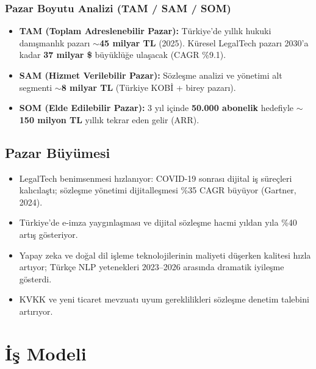 \documentclass[12pt,a4paper]{article}
\begin{document}
\subsubsection{Pazar Boyutu Analizi (TAM / SAM / SOM)}

\begin{itemize}[itemsep=5pt]
  \item \textbf{TAM (Toplam Adreslenebilir Pazar):} Türkiye'de yıllık hukuki danışmanlık pazarı
  $\sim$\textbf{45 milyar TL} (2025). Küresel LegalTech pazarı 2030'a kadar \textbf{37 milyar \$}
  büyüklüğe ulaşacak (CAGR \%9.1).

  \item \textbf{SAM (Hizmet Verilebilir Pazar):} Sözleşme analizi ve yönetimi alt segmenti
  $\sim$\textbf{8 milyar TL} (Türkiye KOBİ + birey pazarı).

  \item \textbf{SOM (Elde Edilebilir Pazar):} 3 yıl içinde \textbf{50.000 abonelik} hedefiyle
  $\sim$\textbf{150 milyon TL} yıllık tekrar eden gelir (ARR).
\end{itemize}

\subsection{Pazar Büyümesi}

\begin{itemize}[itemsep=4pt]
  \item LegalTech benimsenmesi hızlanıyor: COVID-19 sonrası dijital iş süreçleri kalıcılaştı;
  sözleşme yönetimi dijitalleşmesi \%35 CAGR büyüyor (Gartner, 2024).
  \item Türkiye'de e-imza yaygınlaşması ve dijital sözleşme hacmi yıldan yıla \%40 artış gösteriyor.
  \item Yapay zeka ve doğal dil işleme teknolojilerinin maliyeti düşerken kalitesi hızla artıyor;
  Türkçe NLP yetenekleri 2023–2026 arasında dramatik iyileşme gösterdi.
  \item KVKK ve yeni ticaret mevzuatı uyum gereklilikleri sözleşme denetim talebini artırıyor.
\end{itemize}

\section{İş Modeli}
\end{document}
